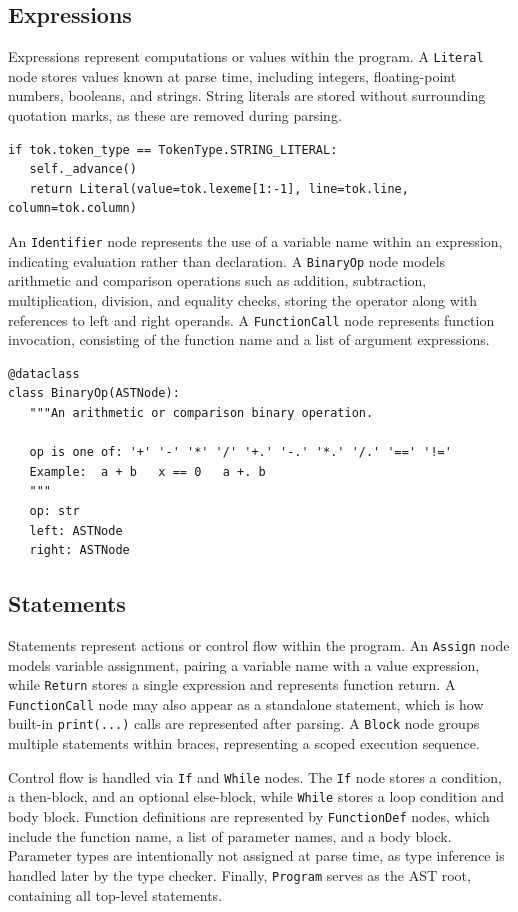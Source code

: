 \subsection{Expressions}
Expressions represent computations or values within the program. A
\texttt{Literal} node stores values known at parse time, including integers,
floating-point numbers, booleans, and strings. String literals are stored
without surrounding quotation marks, as these are removed during parsing.

\begin{lstlisting}
if tok.token_type == TokenType.STRING_LITERAL:
   self._advance()
   return Literal(value=tok.lexeme[1:-1], line=tok.line, column=tok.column)
\end{lstlisting}

An \texttt{Identifier} node represents the use of a variable name within an
expression, indicating evaluation rather than declaration. A \texttt{BinaryOp}
node models arithmetic and comparison operations such as addition, subtraction,
multiplication, division, and equality checks, storing the operator along with
references to left and right operands. A \texttt{FunctionCall} node represents
function invocation, consisting of the function name and a list of argument
expressions.

\begin{lstlisting}
@dataclass
class BinaryOp(ASTNode):
   """An arithmetic or comparison binary operation.

   op is one of: '+' '-' '*' '/' '+.' '-.' '*.' '/.' '==' '!='
   Example:  a + b   x == 0   a +. b
   """
   op: str
   left: ASTNode
   right: ASTNode
\end{lstlisting}

\subsection{Statements}
Statements represent actions or control flow within the program. An
\texttt{Assign} node models variable assignment, pairing a variable name with a
value expression, while \texttt{Return} stores a single expression and
represents function return. A \texttt{FunctionCall} node may also appear as a
standalone statement, which is how built-in \texttt{print(...)} calls are
represented after parsing. A \texttt{Block} node groups multiple statements within braces,
representing a scoped execution sequence.

Control flow is handled via \texttt{If} and \texttt{While} nodes. The
\texttt{If} node stores a condition, a then-block, and an optional else-block,
while \texttt{While} stores a loop condition and body block. Function
definitions are represented by \texttt{FunctionDef} nodes, which include the
function name, a list of parameter names, and a body block. Parameter types
are intentionally not assigned at parse time, as type inference is handled
later by the type checker. Finally, \texttt{Program} serves as the AST root,
containing all top-level statements.

